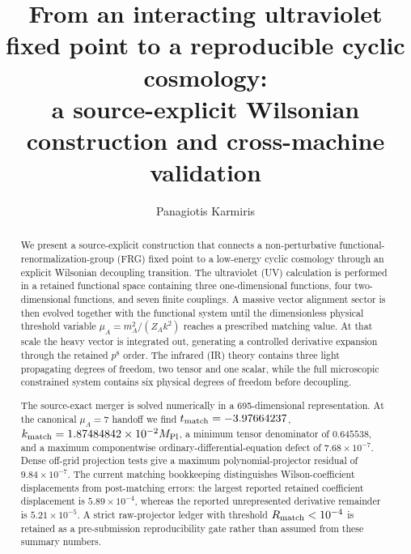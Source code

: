 \documentclass[12pt]{iopart}
\newcommand{\mpl}{M_{\rm Pl}}
\begin{document}
\title{From an interacting ultraviolet fixed point to a reproducible cyclic cosmology:\\
a source-explicit Wilsonian construction and cross-machine validation}

\author{Panagiotis Karmiris}
\address{Independent Researcher, Greece}


\begin{abstract}
We present a source-explicit construction that connects a non-perturbative functional-renormalization-group (FRG) fixed point to a low-energy cyclic cosmology through an explicit Wilsonian decoupling transition.  The ultraviolet (UV) calculation is performed in a retained functional space containing three one-dimensional functions, four two-dimensional functions, and seven finite couplings.  A massive vector alignment sector is then evolved together with the functional system until the dimensionless physical threshold variable $\mu_A=m_A^2/(Z_A k^2)$ reaches a prescribed matching value.  At that scale the heavy vector is integrated out, generating a controlled derivative expansion through the retained $p^8$ order.  The infrared (IR) theory contains three light propagating degrees of freedom, two tensor and one scalar, while the full microscopic constrained system contains six physical degrees of freedom before decoupling.

The source-exact merger is solved numerically in a 695-dimensional representation.  At the canonical $\mu_A=7$ handoff we find $t_{\rm match}=-3.97664237$, $k_{\rm match}=1.87484842\times10^{-2}\mpl$, a minimum tensor denominator of $0.645538$, and a maximum componentwise ordinary-differential-equation defect of $7.68\times10^{-7}$.  Dense off-grid projection tests give a maximum polynomial-projector residual of $9.84\times10^{-7}$.  The current matching bookkeeping distinguishes Wilson-coefficient displacements from post-matching errors: the largest reported retained coefficient displacement is $5.89\times10^{-4}$, whereas the reported unrepresented derivative remainder is $5.21\times10^{-5}$.  A strict raw-projector ledger with threshold $R_{\rm match}<10^{-4}$ is retained as a pre-submission reproducibility gate rather than assumed from these summary numbers.


\end{abstract}
\end{document}
